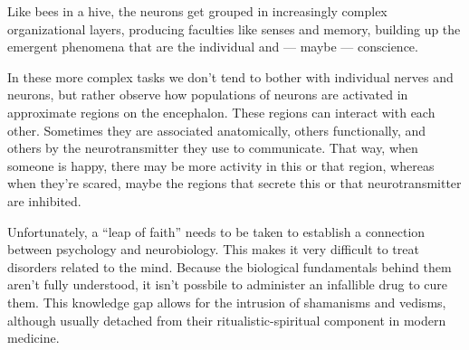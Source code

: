 Like bees in a hive, the neurons get grouped in increasingly complex organizational layers, producing faculties like senses and memory, building up the emergent phenomena that are the individual and --- maybe --- conscience.

In these more complex tasks we don't tend to bother with individual nerves and neurons, but rather observe how populations of neurons are activated in approximate regions on the encephalon. These regions can interact with each other. Sometimes they are associated anatomically, others functionally, and others by the neurotransmitter they use to communicate. That way, when someone is happy, there may be more activity in this or that region, whereas when they're scared, maybe the regions that secrete this or that neurotransmitter are inhibited.

Unfortunately, a \enquote{leap of faith} needs to be taken to establish a connection between psychology and neurobiology. This makes it very difficult to treat disorders related to the mind. Because the biological fundamentals behind them aren't fully understood, it isn't possbile to administer an infallible drug to cure them. This knowledge gap allows for the intrusion of shamanisms and vedisms, although usually detached from their ritualistic-spiritual component in modern medicine.

\newpage
